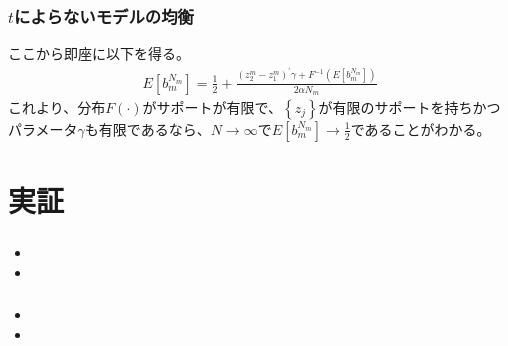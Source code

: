 \documentclass[dvipdfmx, 12pt]{beamer}
\begin{document}
\begin{frame}\frametitle{$t$によらないモデルの均衡}
	ここから即座に以下を得る。
        \begin{align*}
        	E[b_m^{N_m}] = \frac{1}{2} + \frac{(z_2^m - z_1^m)^{'}\gamma + F^{-1} \left( E[b_m^{N_m}] \right)}{2\alpha N_m}
        \end{align*}
これより、分布$F(\cdot)$がサポートが有限で、$\left\{ z_j \right\}$が有限のサポートを持ちかつパラメータ$\gamma$も有限であるなら、$N \to \infty$で$E[b_m^{N_m}] \to \frac{1}{2}$であることがわかる。
\end{frame}

\section{実証}
\begin{frame}\frametitle{}
	\begin{itemize}
		\item 
		\item 
	\end{itemize}
\end{frame}

\begin{frame}\frametitle{}
	\begin{itemize}
		\item 
		\item 
	\end{itemize}
\end{frame}
\end{document}
